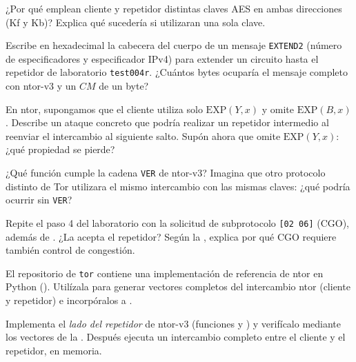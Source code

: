 \begin{esercizio}[1]\label{es:09-direzioni}
¿Por qué emplean cliente y repetidor distintas claves AES en ambas direcciones (Kf y Kb)? Explica qué sucedería si utilizaran una sola clave.
\end{esercizio}

\begin{esercizio}[2]\label{es:09-extend2}
Escribe en hexadecimal la cabecera del cuerpo de un mensaje \texttt{EXTEND2} (número de especificadores y especificador IPv4) para extender un circuito hasta el repetidor de laboratorio \texttt{test004r}. ¿Cuántos bytes ocuparía el mensaje completo con ntor-v3 y un $CM$ de un byte?
\end{esercizio}

\begin{esercizio}[2]\label{es:09-ds}
En ntor, supongamos que el cliente utiliza solo $\mathrm{EXP}(Y,x)$ y omite $\mathrm{EXP}(B,x)$. Describe un ataque concreto que podría realizar un repetidor intermedio al reenviar el intercambio al siguiente salto. Supón ahora que omite $\mathrm{EXP}(Y,x)$: ¿qué propiedad se pierde?
\end{esercizio}

\begin{esercizio}[2]\label{es:09-ver}
¿Qué función cumple la cadena \texttt{VER} de ntor-v3? Imagina que otro protocolo distinto de Tor utilizara el mismo intercambio con las mismas claves: ¿qué podría ocurrir sin \texttt{VER}?
\end{esercizio}

\begin{esercizio}[2]\label{es:09-cc}
Repite el paso 4 del laboratorio con la solicitud de subprotocolo \texttt{[02 06]} (CGO), además de . ¿La acepta el repetidor? Según la , explica por qué CGO requiere también control de congestión.
\end{esercizio}

\begin{esercizio}[3]\label{es:09-ntor-ref}
El repositorio de \texttt{tor} contiene una implementación de referencia de ntor en Python (). Utilízala para generar vectores completos del intercambio ntor (cliente y repetidor) e incorpóralos a .
\end{esercizio}

\begin{esercizio}[3]\label{es:09-relay}
Implementa el \emph{lado del repetidor} de ntor-v3 (funciones  y ) y verifícalo mediante los vectores de la . Después ejecuta un intercambio completo entre el cliente y el repetidor, en memoria.
\end{esercizio}

